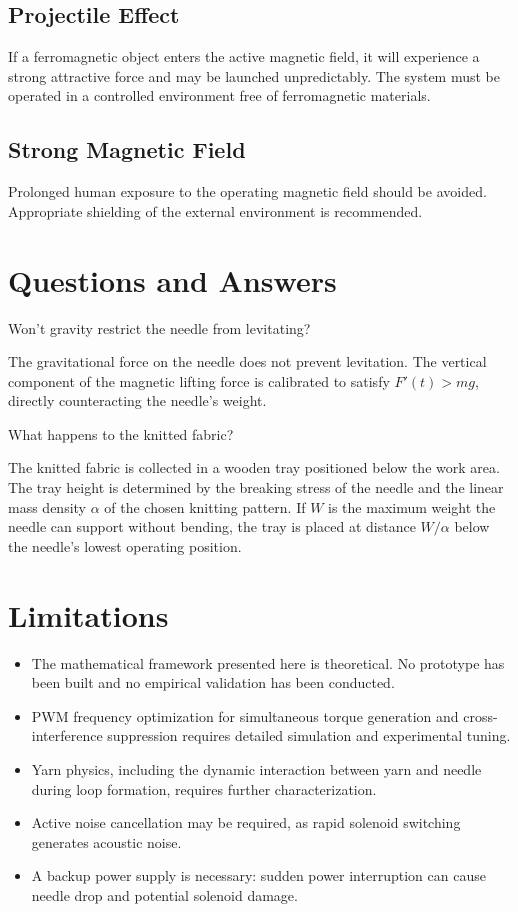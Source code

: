\documentclass[10pt]{article}
\begin{document}
\subsection{Projectile Effect}
If a ferromagnetic object enters the active magnetic field, it will experience a strong attractive force and may be launched unpredictably. The system must be operated in a controlled environment free of ferromagnetic materials.

\subsection{Strong Magnetic Field}
Prolonged human exposure to the operating magnetic field should be avoided. Appropriate shielding of the external environment is recommended.

\section{Questions and Answers}
Won't gravity restrict the needle from levitating?

The gravitational force on the needle does not prevent levitation. The vertical component of the magnetic lifting force is calibrated to satisfy $F'(t)>mg$, directly counteracting the needle's weight.

What happens to the knitted fabric?

The knitted fabric is collected in a wooden tray positioned below the work area. The tray height is determined by the breaking stress of the needle and the linear mass density $\alpha$ of the chosen knitting pattern. If $W$ is the maximum weight the needle can support without bending, the tray is placed at distance $W/\alpha$ below the needle's lowest operating position.

\section{Limitations}
\begin{itemize}
  \item The mathematical framework presented here is theoretical. No prototype has been built and no empirical validation has been conducted.
  \item PWM frequency optimization for simultaneous torque generation and cross-interference suppression requires detailed simulation and experimental tuning.
  \item Yarn physics, including the dynamic interaction between yarn and needle during loop formation, requires further characterization.
  \item Active noise cancellation may be required, as rapid solenoid switching generates acoustic noise.
  \item A backup power supply is necessary: sudden power interruption can cause needle drop and potential solenoid damage.
\end{itemize}
\end{document}
